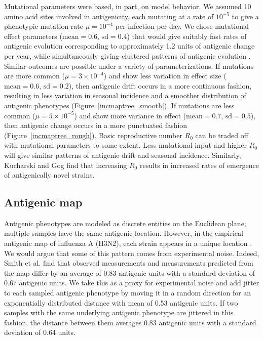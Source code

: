 \documentclass[11pt,oneside,letterpaper]{article}
\begin{document}
Mutational parameters were based, in part, on model behavior.  We assumed 10 amino acid sites involved in antigenicity, each mutating at a rate of $10^{-5}$ \cite{Rambaut08} to give a phenotypic mutation rate $\mu = 10^{-4}$ per infection per day.  We chose mutational effect parameters ($\textrm{mean} = 0.6$, $\textrm{sd} = 0.4$) that would give suitably fast rates of antigenic evolution corresponding to approximately 1.2 units of antigenic change per year, while simultaneously giving clustered patterns of antigenic evolution  \cite{Smith04}.  Similar outcomes are possible under a variety of parameterizations.  If mutations are more common ($\mu = 3 \times 10^{-4}$) and show less variation in effect size ($\textrm{mean} = 0.6$, $\textrm{sd} = 0.2$), then antigenic drift occurs in a more continuous fashion, resulting in less variation in seasonal incidence and a smoother distribution of antigenic phenotypes (Figure~\ref{incmaptree_smooth}).  If mutations are less common ($\mu = 5 \times 10^{-5}$) and show more variance in effect ($\textrm{mean} = 0.7$, $\textrm{sd} = 0.5$), then antigenic change occurs in a more punctuated fashion (Figure~\ref{incmaptree_rough}).  Basic reproductive number $R_0$ can be traded off with mutational parameters to some extent.  Less mutational input and higher $R_0$ will give similar patterns of antigenic drift and seasonal incidence.  Similarly, Kucharski and Gog \cite{Kucharski11} find that increasing $R_0$ results in increased rates of emergence of antigenically novel strains.

\subsection*{Antigenic map}

Antigenic phenotypes are modeled as discrete entities on the Euclidean plane; multiple samples have the same antigenic location.  However, in the empirical antigenic map of influenza A (H3N2), each strain appears in a unique location \cite{Smith04}.  We would argue that some of this pattern comes from experimental noise.  Indeed, Smith et al. \cite{Smith04} find that observed measurements and measurements predicted from the map differ by an average of 0.83 antigenic units with a standard deviation of 0.67 antigenic units.  We take this as a proxy for experimental noise and add jitter to each sampled antigenic phenotype by moving it in a random direction for an exponentially distributed distance with mean of 0.53 antigenic units.  If two samples with the same underlying antigenic phenotype are jittered in this fashion, the distance between them averages 0.83 antigenic units with a standard deviation of 0.64 units.
\end{document}
